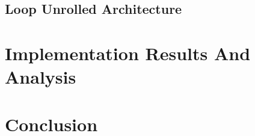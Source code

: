 \documentclass[sn-basic]{sn-jnl}%
\begin{document}
\subsection{Loop Unrolled Architecture}\label{subsec3}

\section{Implementation Results And Analysis}\label{sec4}

\section{Conclusion}\label{sec5}

\end{document}
